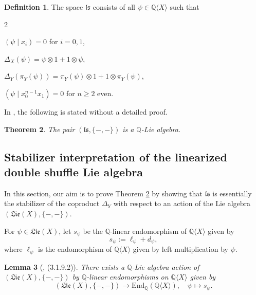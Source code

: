 \documentclass[11pt, a4paper]{amsart}
\newtheorem{theorem}{Theorem}[section]
\newtheorem{lemma}[theorem]{Lemma}
\numberwithin{equation}{section}
\theoremstyle{definition}
\newtheorem{definition}[theorem]{Definition}
\newcommand{\Q}{\mathbb{Q}}
\newcommand{\QX}{\Q\langle X\rangle}
\newcommand{\ls}{\mathfrak{ls}}
\newcommand{\Lie}{\mathfrak{Lie}}
\begin{document}
\begin{definition} \label{def:ls}
    The space $\ls$ consists of all $\psi \in \QX$ such that
    \begin{enumerate}[label=(\roman*), leftmargin=*, itemsep=5pt]
        \begin{multicols}{2}
        \item $(\psi\mid x_i)=0$ for $i=0,1$,
        \item $\Delta_X(\psi)=\psi\otimes1+1\otimes\psi$,
        \item $\Delta_Y(\pi_Y(\psi))=\pi_Y(\psi)\otimes1+1\otimes\pi_Y(\psi)$,
        \item $(\psi\mid x_0^{n-1}x_1)=0$ for $n\geq2$ even.
        \end{multicols}
    \end{enumerate}
\end{definition}

In \cite[Theorem 5.5]{Br21}, the following is stated without a detailed proof.
\begin{theorem} \label{thm:ls_Lie}
    The pair $(\ls,\{-,-\})$ is a $\Q$-Lie algebra.
\end{theorem}

\subsection{Stabilizer interpretation of the linearized double shuffle Lie algebra} %

In this section, our aim is to prove Theorem \ref{thm:ls_Lie} by showing that $\ls$ is essentially the stabilizer of the coproduct $\Delta_Y$ with respect to an action of the Lie algebra $(\Lie(X),\{-,-\})$.



For $\psi \in \Lie(X)$, let $s_\psi$ be the $\Q$-linear endomorphism of $\QX$ given by 
\[
    s_{\psi} := \ell_{\psi} + d_{\psi},
\]
where $\ell_\psi$ is the endomorphism of $\QX$ given by left multiplication by $\psi$.

\begin{lemma}[\cite{Ra02}, (3.1.9.2)] \label{lem:Lib_act_QX}
    There exists a $\Q$-Lie algebra action of $(\Lie(X), \{-,-\})$ by $\Q$-linear endomorphisms on $\QX$ given by
    \[
        (\Lie(X), \{-,-\}) \to \mathrm{End}_{\Q}(\QX), \quad \psi \mapsto s_{\psi}.
    \]
\end{lemma}
\end{document}
